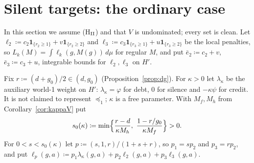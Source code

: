 \documentclass[11pt]{article}
\theoremstyle{definition}\newtheorem{definition}[theorem]{Definition}
\theoremstyle{remark}\newtheorem{remark}[theorem]{Remark}
\newcommand{\one}{\mathbf 1}
\begin{document}
\section{Silent targets: the ordinary case}\label{sec:silent}

In this section we assume (H$_{\rm II}$) and that $V$ is undominated; every
set is clean. Let
$\ell_2\coloneqq c_2\one_{\{r_2\ge1\}}+v\one_{\{r_2\ge2\}}$ and
$\ell_3\coloneqq c_3\one_{\{r_3\ge1\}}+u\one_{\{r_3\ge2\}}$ be the local
penalties, so $L_k(M)=\int\ell_k(g,M(g))\,d\mu$ for regular $M$, and put
$\bar e_2\coloneqq c_2+v$, $\bar e_3\coloneqq c_3+u$, integrable bounds for $\ell_2,
\ell_3$ on $H'$.

Fix $r\coloneqq(d+g_0)/2\in(d,g_0)$ (Proposition~\ref{prop:dg}). For
$\kappa>0$ let $\lambda_\kappa$ be the auxiliary world-1 weight on $H'$:
$\lambda_\kappa=\varphi$ for debt, $0$ for silence and $-\kappa\psi$ for
credit. It is not claimed to represent $\preceq_1$; $\kappa$ is a free
parameter. With $M_f,M_h$ from Corollary~\ref{cor:kappaV} put
\[
 s_0(\kappa)\coloneqq\min\Bigl\{\frac{r-d}{\kappa M_h},\
 \frac{1-r/g_0}{\kappa M_f}\Bigr\}>0.
\]
For $0<s<s_0(\kappa)$ let $p\coloneqq(s,1,r)/(1+s+r)$, so $p_1=sp_2$ and
$p_3=rp_2$, and put
$\ell_p(g,a)\coloneqq p_1\lambda_\kappa(g,a)+p_2\ell_2(g,a)+p_3\ell_3(g,a)$.
\end{document}
